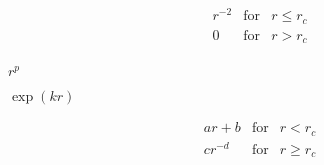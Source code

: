 \documentclass{article}
\begin{document}
\begin{eqnarray*} r^{-2} & \mbox{for} & r \leq r_c \\ 0 & \mbox{for} & r > r_c\\ \end{eqnarray*}
\pagebreak

$r^p$
\pagebreak

$\exp(k r)$
\pagebreak

\begin{eqnarray*} ar + b & \mbox{for} & r < r_c \\ c r^{-d} & \mbox{for} & r \geq r_c\\ \end{eqnarray*}
\pagebreak
\end{document}
